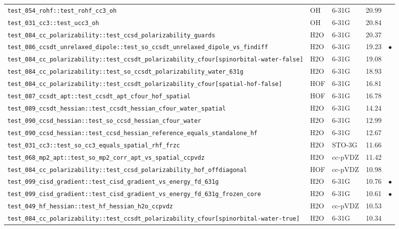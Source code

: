 \documentclass[10pt]{article}
\begin{document}
\begin{longtable}{l l l r c}
\texttt{test\_054\_rohf::test\_rohf\_cc3\_oh} & OH & 6-31G & 20.99 &  \\
\texttt{test\_031\_cc3::test\_ucc3\_oh} & OH & 6-31G & 20.84 &  \\
\texttt{test\_084\_cc\_polarizability::test\_ccsd\_polarizability\_guards} & H2O & 6-31G & 20.37 &  \\
\texttt{test\_086\_ccsdt\_unrelaxed\_dipole::test\_so\_ccsdt\_unrelaxed\_dipole\_vs\_findiff} & H2O & 6-31G & 19.23 & $\bullet$ \\
\texttt{test\_084\_cc\_polarizability::test\_ccsdt\_polarizability\_cfour[spinorbital-water-false]} & H2O & 6-31G & 19.08 &  \\
\texttt{test\_084\_cc\_polarizability::test\_so\_ccsdt\_polarizability\_water\_631g} & H2O & 6-31G & 18.93 &  \\
\texttt{test\_084\_cc\_polarizability::test\_ccsdt\_polarizability\_cfour[spatial-hof-false]} & HOF & 6-31G & 16.81 &  \\
\texttt{test\_087\_ccsdt\_apt::test\_ccsdt\_apt\_cfour\_hof\_spatial} & HOF & 6-31G & 16.78 &  \\
\texttt{test\_089\_ccsdt\_hessian::test\_ccsdt\_hessian\_cfour\_water\_spatial} & H2O & 6-31G & 14.24 &  \\
\texttt{test\_090\_ccsd\_hessian::test\_so\_ccsd\_hessian\_cfour\_water} & H2O & 6-31G & 12.99 &  \\
\texttt{test\_090\_ccsd\_hessian::test\_ccsd\_hessian\_reference\_equals\_standalone\_hf} & H2O & 6-31G & 12.67 &  \\
\texttt{test\_031\_cc3::test\_so\_cc3\_equals\_spatial\_rhf\_frzc} & H2O & STO-3G & 11.66 &  \\
\texttt{test\_068\_mp2\_apt::test\_so\_mp2\_corr\_apt\_vs\_spatial\_ccpvdz} & H2O & cc-pVDZ & 11.42 &  \\
\texttt{test\_084\_cc\_polarizability::test\_ccsd\_polarizability\_hof\_offdiagonal} & HOF & cc-pVDZ & 10.98 &  \\
\texttt{test\_099\_cisd\_gradient::test\_cisd\_gradient\_vs\_energy\_fd\_631g} & H2O & 6-31G & 10.76 & $\bullet$ \\
\texttt{test\_099\_cisd\_gradient::test\_cisd\_gradient\_vs\_energy\_fd\_631g\_frozen\_core} & H2O & 6-31G & 10.61 & $\bullet$ \\
\texttt{test\_049\_hf\_hessian::test\_hf\_hessian\_h2o\_ccpvdz} & H2O & cc-pVDZ & 10.53 &  \\
\texttt{test\_084\_cc\_polarizability::test\_ccsdt\_polarizability\_cfour[spinorbital-water-true]} & H2O & 6-31G & 10.34 &  \\

\end{longtable}
\end{document}
